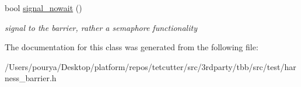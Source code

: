 \begin{DoxyCompactItemize}
\item 
\hypertarget{classHarness_1_1SpinBarrier_a6c22bc19755a5a4276caf5fec9e4e3f4}{}bool \hyperlink{classHarness_1_1SpinBarrier_a6c22bc19755a5a4276caf5fec9e4e3f4}{signal\+\_\+nowait} ()\label{classHarness_1_1SpinBarrier_a6c22bc19755a5a4276caf5fec9e4e3f4}

\begin{DoxyCompactList}\small\item\em signal to the barrier, rather a semaphore functionality \end{DoxyCompactList}\end{DoxyCompactItemize}


The documentation for this class was generated from the following file\+:\begin{DoxyCompactItemize}
\item 
/\+Users/pourya/\+Desktop/platform/repos/tetcutter/src/3rdparty/tbb/src/test/harness\+\_\+barrier.\+h\end{DoxyCompactItemize}
